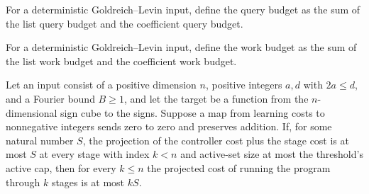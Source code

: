 \begin{definition}
\label{FABL.deterministicGoldreichLevinQueryBudget}
\leanok
{}
For a deterministic Goldreich–Levin input, define the query budget as the sum of the
list query budget and the coefficient query budget.
\end{definition}

\begin{definition}
\label{FABL.deterministicGoldreichLevinWorkBudget}
\leanok
{}
For a deterministic Goldreich–Levin input, define the work budget as the sum of the list
work budget and the coefficient work budget.
\end{definition}

\begin{theorem}
\label{FABL.deterministicGoldreichLevinRunUpToProgram_costProjection_le}
\leanok
{}
Let an input consist of a positive dimension $n$, positive integers $a,d$ with $2a\le
d$, and a Fourier bound $B\ge1$, and let the target be a function from the
$n$-dimensional sign cube to the signs. Suppose a map from learning costs to nonnegative
integers sends zero to zero and preserves addition. If, for some natural number $S$, the
projection of the controller cost plus the stage cost is at most $S$ at every stage with
index $k<n$ and active-set size at most the threshold's active cap, then for every $k\le
n$ the projected cost of running the program through $k$ stages is at most $kS$.
\end{theorem}

